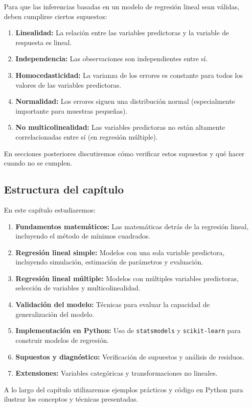 Para que las inferencias basadas en un modelo de regresión lineal sean válidas, deben cumplirse ciertos supuestos:

\begin{enumerate}
	\item \textbf{Linealidad:} La relación entre las variables predictoras y la variable de respuesta es lineal.
	
	\item \textbf{Independencia:} Las observaciones son independientes entre sí.
	
	\item \textbf{Homocedasticidad:} La varianza de los errores es constante para todos los valores de las variables predictoras.
	
	\item \textbf{Normalidad:} Los errores siguen una distribución normal (especialmente importante para muestras pequeñas).
	
	\item \textbf{No multicolinealidad:} Las variables predictoras no están altamente correlacionadas entre sí (en regresión múltiple).
\end{enumerate}

En secciones posteriores discutiremos cómo verificar estos supuestos y qué hacer cuando no se cumplen.

\subsection{Estructura del capítulo}

En este capítulo estudiaremos:

\begin{enumerate}
	\item \textbf{Fundamentos matemáticos:} Las matemáticas detrás de la regresión lineal, incluyendo el método de mínimos cuadrados.
	
	\item \textbf{Regresión lineal simple:} Modelos con una sola variable predictora, incluyendo simulación, estimación de parámetros y evaluación.
	
	\item \textbf{Regresión lineal múltiple:} Modelos con múltiples variables predictoras, selección de variables y multicolinealidad.
	
	\item \textbf{Validación del modelo:} Técnicas para evaluar la capacidad de generalización del modelo.
	
	\item \textbf{Implementación en Python:} Uso de \texttt{statsmodels} y \texttt{scikit-learn} para construir modelos de regresión.
	
	\item \textbf{Supuestos y diagnóstico:} Verificación de supuestos y análisis de residuos.
	
	\item \textbf{Extensiones:} Variables categóricas y transformaciones no lineales.
\end{enumerate}

A lo largo del capítulo utilizaremos ejemplos prácticos y código en Python para ilustrar los conceptos y técnicas presentadas.
